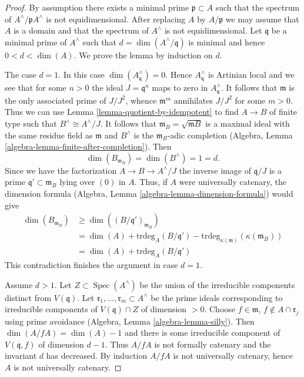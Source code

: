 \documentclass[10pt,a4paper]{amsart}
\theoremstyle{plain}
\theoremstyle{definition}
\theoremstyle{remark}
\numberwithin{equation}{subsection}
\def\Spec{\mathop{\mathrm{Spec}}}
\begin{document}
\begin{proof}
By assumption there exists a minimal prime $\mathfrak p \subset A$ such that
the spectrum of $A^\wedge /\mathfrak p A^\wedge$ is not equidimensional.
After replacing $A$ by $A/\mathfrak p$ we may assume that $A$
is a domain and that the spectrum of $A^\wedge$ is not equidimensional.
Let $\mathfrak q$ be a minimal prime of
$A^\wedge$ such that $d = \dim(A^\wedge/\mathfrak q)$
is minimal and hence $0 < d < \dim(A)$. We prove the lemma by induction
on $d$.

\medskip\noindent
The case $d = 1$. In this case $\dim(A^\wedge_\mathfrak q) = 0$.
Hence $A^\wedge_\mathfrak q$ is Artinian local and we see that
for some $n > 0$ the ideal $J = \mathfrak q^n$ maps to zero in
$A^\wedge_\mathfrak q$. It follows that $\mathfrak m$ is the
only associated prime of $J/J^2$, whence $\mathfrak m^m$ annihilates
$J/J^2$ for some $m > 0$. Thus we can use
Lemma \ref{lemma-quotient-by-idempotent}
to find $A \to B$ of finite type such that $B^\wedge \cong A^\wedge/J$.
It follows that $\mathfrak m_B = \sqrt{\mathfrak mB}$ is a maximal
ideal with the same residue field as $\mathfrak m$ and $B^\wedge$
is the $\mathfrak m_B$-adic completion
(Algebra, Lemma \ref{algebra-lemma-finite-after-completion}).
Then
$$
\dim(B_{\mathfrak m_B}) = \dim(B^\wedge) = 1 = d.
$$
Since we have the factorization $A \to B \to A^\wedge/J$ the inverse image
of $\mathfrak q/J$ is a prime $\mathfrak q' \subset \mathfrak m_B$ lying
over $(0)$ in $A$. Thus, if $A$ were universally catenary, the dimension
formula (Algebra, Lemma \ref{algebra-lemma-dimension-formula}) would give
\begin{align*}
\dim(B_{\mathfrak m_B})
& \geq
\dim((B/\mathfrak q')_{\mathfrak m_B}) \\
& =
\dim(A) + \text{trdeg}_A(B/\mathfrak q') -
\text{trdeg}_{\kappa(\mathfrak m)}(\kappa(\mathfrak m_B)) \\
& =
\dim(A) + \text{trdeg}_A(B/\mathfrak q')
\end{align*}
This contradiction finishes the argument in case $d = 1$.

\medskip\noindent
Assume $d > 1$. Let $Z \subset \Spec(A^\wedge)$ be the union of
the irreducible components distinct from $V(\mathfrak q)$.
Let $\mathfrak r_1, \ldots, \mathfrak r_m \subset A^\wedge$
be the prime ideals corresponding to irreducible components of
$V(\mathfrak q) \cap Z$ of dimension $> 0$.
Choose $f \in \mathfrak m$, $f \not \in A \cap \mathfrak r_j$
using prime avoidance (Algebra, Lemma \ref{algebra-lemma-silly}).
Then $\dim(A/fA) = \dim(A) - 1$ and there is some irreducible
component of $V(\mathfrak q, f)$ of dimension $d - 1$.
Thus $A/fA$ is not formally catenary and the invariant $d$ has
decreased. By induction $A/fA$ is not universally catenary, hence
$A$ is not universally catenary.
\end{proof}
\end{document}
